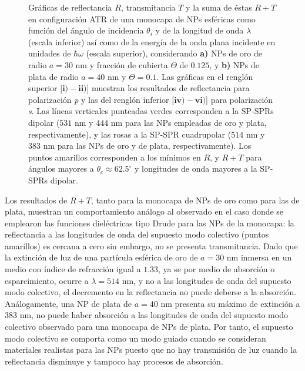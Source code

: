 \begin{figure}[h!]
\begin{subfigure}{.7\linewidth}
		\end{subfigure}\vspace*{-.5em}
	\caption{Gráficas de reflectancia $R$, transmitancia $T$ y la suma de éstas $R+T$   en configuración ATR de una monocapa de NPs esféricas como función del ángulo de incidencia $\theta_i$ y de la longitud de onda $\lambda$ (escala inferior) así como de la energía de la onda plana incidente en unidades de $\hbar\omega$ (escala superior), considerando \textbf{a)} NPs de oro de radio $a=30$ nm y fracción de cubierta $\Theta$ de $0.125$, y \textbf{b)} NPs de plata de radio $a=40$ nm y $\Theta=0.1$.  Las gráficas   en el renglón superior [$\mathbf{i)-ii)}$]  muestran los resultados de reflectancia para  polarización \emph{p} y las del renglón inferior  [$\mathbf{iv)-vi)}$] para polarización  \emph{s}. Las líneas verticales punteadas verdes corresponden a la SP-SPRs dipolar ($531$ nm y $444$ nm para las NPs empleadas de oro y plata, respectivamente), y las rosas a la SP-SPR cuadrupolar ($514$ nm y $383$ nm para las NPs de oro y de plata, respectivamente). Los puntos amarillos corresponden a los mínimos en $R$, y $R+T$ para ángulos mayores a $\theta_c\approx 62.5^\circ$ y longitudes de onda mayores a la SP-SPRs dipolar. }\label{fig:RT-AuAg}
	\end{figure}	

Los resultados de $R+T$, tanto para la monocapa de NPs de oro como para las de plata, muestran un comportamiento análogo al observado en el caso donde se emplearon las funciones dieléctricas tipo Drude para las NPs de la monocapa: la reflectancia a las longitudes de onda del supuesto modo colectivo (puntos amarillos) es cercana a cero sin embargo, no se presenta transmitancia. Dado que la extinción de luz de una partícula esférica de oro de $a=30$ nm inmersa en un medio con índice de refracción igual a $1.33$, ya se por medio de absorción o esparcimiento, ocurre a $\lambda= 514$ nm, y no a las longitudes de onda del supuesto modo colectivo, el decremento en la reflectancia no puede deberse a la absorción. Análogamente, una NP de plata de $a=40$ nm presenta su máximo de extinción a $383$ nm, no puede haber absorción a las longitudes de onda del supuesto modo colectivo observado para una monocapa de NPs de plata. Por tanto, el supuesto modo colectivo se comporta como un modo guiado cuando se consideran materiales realistas para las NPs puesto que no hay transmisión de luz cuando la reflectancia disminuye y tampoco hay procesos de absorción.

